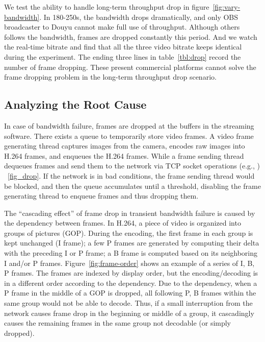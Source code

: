  We test the ability to handle long-term throughput drop in figure~\ref{fig:vary-bandwidth}. In 180-250s, the bandwidth drops dramatically, and only OBS broadcaster to Douyu cannot make full use of throughput. Although others follows the bandwidth, frames are dropped constantly this period. And we watch the real-time bitrate and find that all the three video bitrate keeps identical during the experiment. The ending three lines in table~\ref{tbl:drop} record the number of frame dropping. These present commercial platforms cannot solve the frame dropping problem in the long-term throughput drop scenario.

\subsection{Analyzing the Root Cause}

In case of bandwidth failure, frames are dropped at the buffers in the streaming software. There exists a queue to temporarily store video frames. A video frame generating thread captures images from the camera, encodes raw images into H.264 frames, and enqueues the H.264 frames. While a frame sending thread dequeues frames and send them to the network via TCP socket operations (e.g., \mywrite) ~\ref{fig_drop}.
If the network is in bad conditions, the frame sending thread would be blocked, and then the queue accumulates until a threshold, disabling the frame generating thread to enqueue frames and thus dropping them.



The ``cascading effect'' of frame drop in transient bandwidth failure is caused by the dependency between frames. In H.264, a piece of video is organized into groups of pictures (GOP). During the encoding, the first frame in each group is kept unchanged (I frame); a few P frames are generated by computing their delta with the preceding I or P frame; a B frame is computed based on its neighboring I and/or P frames. Figure~\ref{fig:frame-order} shows an example of a series of I, B, P frames. The frames are indexed by display order, but the encoding/decoding is in a different order according to the dependency. Due to the dependency, when a P frame in the middle of a GOP is dropped, all following P, B frames within the same group would not be able to decode. Thus, if a small interruption from the network causes frame drop in the beginning or middle of a group, it cascadingly causes the remaining frames in the same group not decodable (or simply dropped).

